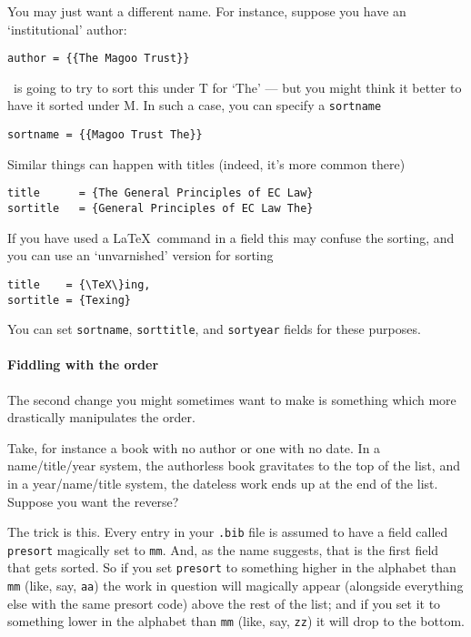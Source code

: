 You may just want a different name. For instance, suppose you have an
`institutional' author:
\begin{Verbatim}
author = {{The Magoo Trust}}
\end{Verbatim}
\biblatex\ is going to try to sort this under T for `The' --- but you
might think it better to have it sorted under M. In such a case, you
can specify a \texttt{sortname}
\begin{Verbatim}
sortname = {{Magoo Trust The}}
\end{Verbatim}

Similar things can happen with titles (indeed, it's more common
there)\label{sorting:sorttitle}
\begin{Verbatim}
title      = {The General Principles of EC Law}
sortitle   = {General Principles of EC Law The}
\end{Verbatim}

If you have used a \LaTeX\ command in a field this may confuse the
sorting, and you can use an `unvarnished' version for sorting
\begin{Verbatim}
title    = {\TeX\}ing,
sortitle = {Texing}
\end{Verbatim}

You can set \texttt{sortname}, \texttt{sorttitle}, and \texttt{sortyear}
fields for these purposes.

\paragraph{Fiddling with the order} The second change you might sometimes
want to make is something which more drastically manipulates the order.

Take, for instance a book with no author or one with no date. In a
name/title/year system, the authorless book gravitates to the top of
the list, and in a year/name/title system, the dateless work ends up
at the end of the list. Suppose you want the reverse?

The trick is this. Every entry in your \texttt{.bib} file is assumed
to have a field called \texttt{presort} magically set to
\texttt{mm}. And, as the name suggests, that is the first field that
gets sorted. So if you set \texttt{presort} to something higher in the
alphabet than \texttt{mm} (like, say, \texttt{aa}) the work in
question will magically appear (alongside everything else with the
same presort code) above the rest of the list; and if you set it to
something lower in the alphabet than \texttt{mm} (like, say,
\texttt{zz}) it will drop to the bottom.

